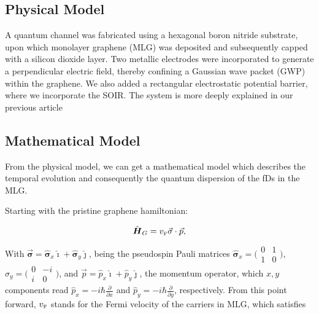 \subsection{Physical Model}\label{subsec:physical-model}

A quantum channel was fabricated using a hexagonal boron nitride substrate, upon which monolayer graphene (MLG) was deposited and subsequently capped with a silicon dioxide layer.
Two metallic electrodes were incorporated to generate a perpendicular electric field, thereby confining a Gaussian wave packet (GWP) within the graphene.
We also added a rectangular electrostatic potential barrier, where we incorporate the SOIR\@.
The system is more deeply explained in our previous article\cite{Serna2019}


\subsection{Mathematical Model}\label{subsec:mathematical-model}

From the physical model, we can get a mathematical model which describes the temporal evolution and consequently the quantum dispersion of the fDs in the MLG\@.

Starting with the pristine graphene hamiltonian\cite{Geimk2007}:

\begin{equation}
    \label{eq:pristGr}
    \hat{\mbox{\boldmath $H$}}_G = v_{\mbox{\tiny F}}\vec{\mathbf{\sigma}}\cdot\vec{p},
\end{equation}

\noindent With $\vec{\mathbf{\sigma}} = \hat{\mathbf{\sigma}}_{x}\hat{\imath} + \hat{\mathbf{\sigma}}_{y}\hat{\jmath}$, being the pseudospin Pauli matrices $\hat{\mathbf{\sigma}}_{x} = \bigl(\begin{smallmatrix}
                                                                                                                                                                                                   0&1 \\ 1&0
\end{smallmatrix} \bigr)$, $\hat{\sigma}_{y} = \bigl(\begin{smallmatrix}
                                                         0&-i \\ i&0
\end{smallmatrix} \bigr)$, and $\vec{p}=\hat{p}_{x}\hat{\imath}+\hat{p}_{y}\hat{\jmath}$, the momentum operator, which $x, y$ components read $\hat{p}_{x} = -i\hbar\frac{\partial}{\partial x}$ and $\hat{p}_{y} = -i\hbar\frac{\partial}{\partial y}$, respectively.
From this point forward, $v_{\mbox{\tiny F}}$ stands for the Fermi velocity of the carriers in MLG, which satisfies

